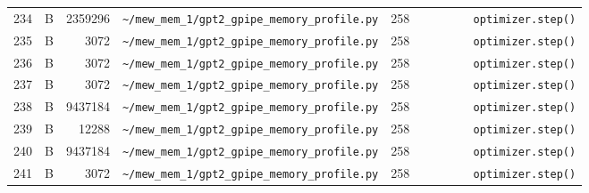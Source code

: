 \documentclass{article}
\begin{document}
\begin{longtable}{r l r p{6.5cm} r p{7.0cm}}
234 & B & 2359296 & \lstinline|~/mew_mem_1/gpt2_gpipe_memory_profile.py| & 258 & \lstinline|        optimizer.step()| \\
235 & B & 3072 & \lstinline|~/mew_mem_1/gpt2_gpipe_memory_profile.py| & 258 & \lstinline|        optimizer.step()| \\
236 & B & 3072 & \lstinline|~/mew_mem_1/gpt2_gpipe_memory_profile.py| & 258 & \lstinline|        optimizer.step()| \\
237 & B & 3072 & \lstinline|~/mew_mem_1/gpt2_gpipe_memory_profile.py| & 258 & \lstinline|        optimizer.step()| \\
238 & B & 9437184 & \lstinline|~/mew_mem_1/gpt2_gpipe_memory_profile.py| & 258 & \lstinline|        optimizer.step()| \\
239 & B & 12288 & \lstinline|~/mew_mem_1/gpt2_gpipe_memory_profile.py| & 258 & \lstinline|        optimizer.step()| \\
240 & B & 9437184 & \lstinline|~/mew_mem_1/gpt2_gpipe_memory_profile.py| & 258 & \lstinline|        optimizer.step()| \\
241 & B & 3072 & \lstinline|~/mew_mem_1/gpt2_gpipe_memory_profile.py| & 258 & \lstinline|        optimizer.step()| \\
\end{longtable}
\end{document}
